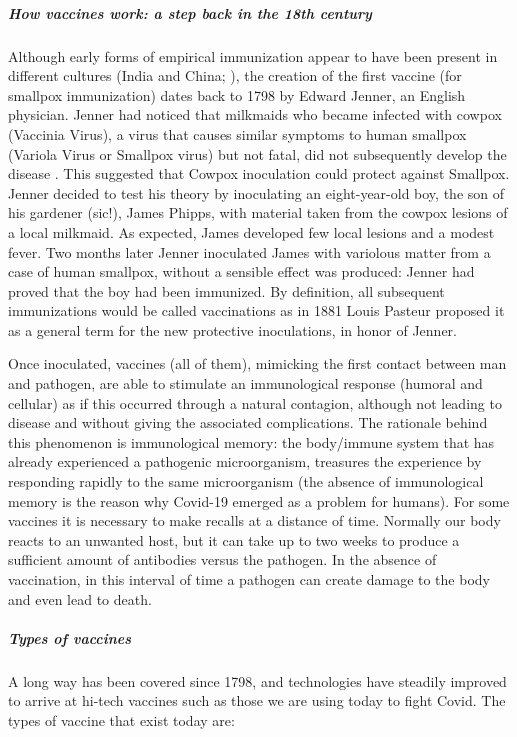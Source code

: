 \documentclass[graybox]{svmult}
\begin{document}
\subparagraph{How vaccines work: a step back in the 18th century}
\label{hints}

Although early forms of empirical immunization appear to have been present in different cultures (India and China; \cite{Boylston2012}), the creation of the first vaccine (for smallpox immunization) dates back to 1798 by Edward Jenner, an English physician. Jenner had noticed that milkmaids who became infected with cowpox (Vaccinia Virus), a virus that causes similar symptoms to human smallpox (Variola Virus or Smallpox virus) but not fatal, did not subsequently develop the disease \cite{jenner1802}. This suggested that Cowpox inoculation could protect against Smallpox. Jenner decided to test his theory by inoculating an eight-year-old boy, the son of his gardener (sic!), James Phipps, with material taken from the cowpox lesions of a local milkmaid. As expected, James developed few local lesions and a modest fever. Two months later Jenner inoculated James with variolous matter from a case of human smallpox,  without a sensible effect was produced: Jenner had proved that the boy had been immunized. By definition, all subsequent immunizations would be called vaccinations as in 1881 Louis Pasteur proposed it as a general term for the new protective inoculations, in honor of Jenner.
 
Once inoculated, vaccines (all of them), mimicking the first contact between man and pathogen, are able to stimulate an immunological response (humoral and cellular) as if this occurred through a natural contagion, although not leading to disease and without giving the associated complications. The rationale behind this phenomenon is immunological memory: the body/immune system that has already experienced a pathogenic microorganism, treasures the experience by responding rapidly to the same microorganism (the absence of immunological memory is the reason why Covid-19 emerged as a problem for humans). For some vaccines it is necessary to make recalls at a distance of time. Normally our body reacts to an unwanted host, but it can take up to two weeks to produce a sufficient amount of antibodies versus the pathogen. In the absence of vaccination, in this interval of time a pathogen can create damage to the body and even lead to death. 
 
\subparagraph{Types of vaccines}
\label{types}

A long way has been covered since 1798, and technologies have steadily improved to arrive at hi-tech vaccines such as those we are using today to fight Covid. The types of vaccine that exist today are:
\end{document}
